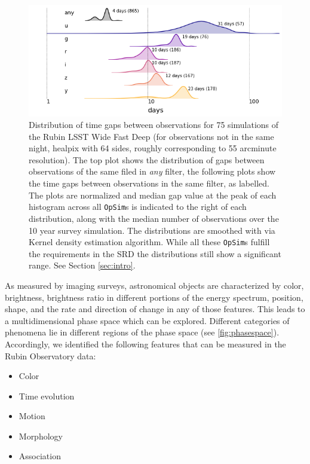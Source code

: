 \documentclass[onecolumn, 10pt]{aastex63}
\newcommand{\opsim}{\texttt{OpSim}}
\begin{document}
\begin{center}
\begin{figure}[t!]
\centering
\includegraphics[scale=0.7]{figures/intranight_gap.png}
\caption{Distribution of time gaps between observations for 75 simulations of the Rubin LSST Wide Fast Deep (for observations not in the same night,  healpix with 64 sides, roughly corresponding to 55 arcminute resolution). The top plot shows the distribution of gaps between observations of the same filed in \emph{any} filter, the following plots show the time gaps between observations in the same filter, as labelled. The plots are normalized and median gap value at the peak of each histogram across all \opsim s is indicated to the right of each distribution, along with the median  number of observations over the 10 year survey simulation. The distributions are smoothed with via Kernel density estimation algorithm. While all these \opsim s fulfill the requirements in the SRD \citep{lsstSRD} the distributions still show a significant range. See Section \ref{sec:intro}.}
\label{fig:tgaps_example}
\end{figure}
\end{center}
As measured by imaging surveys, astronomical objects are characterized by color, brightness, brightness ratio in different portions of the energy spectrum, position, shape, and the rate and direction of change in any of those features. This leads to a multidimensional phase space which can be explored. Different categories of phenomena lie in different regions of the phase space (see \autoref{fig:phasespace}). Accordingly, we identified the following features that can be measured in the Rubin Observatory data:
\begin{itemize}
\item Color
\item Time evolution
\item Motion    
\item Morphology
\item Association
\end{itemize}
\end{document}
